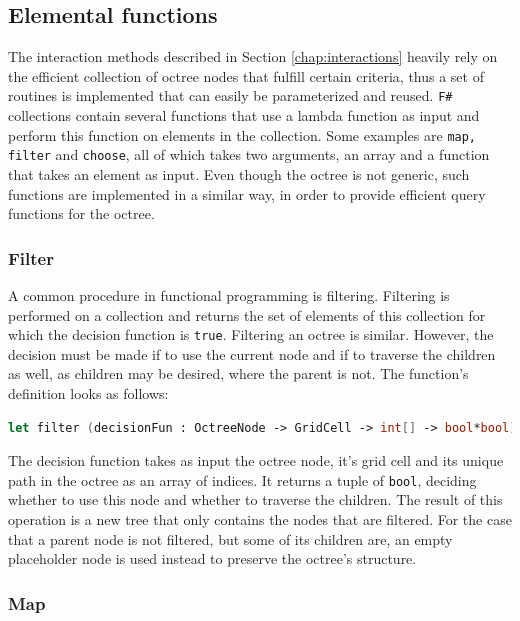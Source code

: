 \subsection{Elemental functions}

The interaction methods described in Section \ref{chap:interactions} heavily rely on the efficient collection of octree nodes that fulfill certain criteria, thus a set of routines is implemented that can easily be parameterized and reused. \verb|F#| collections contain several functions that use a lambda function as input and perform this function on elements in the collection. Some examples are \verb|map, filter| and \verb|choose|, all of which takes two arguments, an array and a function that takes an element as input. Even though the octree is not generic, such functions are implemented in a similar way, in order to provide efficient query functions for the octree. 


\subsubsection{Filter}

A common procedure in functional programming is filtering. Filtering is performed on a collection and returns the set of elements of this collection for which the decision function is \verb|true|. Filtering an octree is similar. However, the decision must be made if to use the current node and if to traverse the children as well, as children may be desired, where the parent is not. 
The function's definition looks as follows: 

\begin{lstlisting}[language = FSharp]
let filter (decisionFun : OctreeNode -> GridCell -> int[] -> bool*bool) (tree: Octree) : (Octree)= ...
\end{lstlisting}

The decision function takes as input the octree node, it's grid cell and its unique path in the octree as an array of indices. It returns a tuple of \verb|bool|, deciding whether to use this node and whether to traverse the children. The result of this operation is a new tree that only contains the nodes that are filtered. For the case that a parent node is not filtered, but some of its children are, an empty placeholder node is used instead to preserve the octree's structure. 


\subsubsection{Map}

